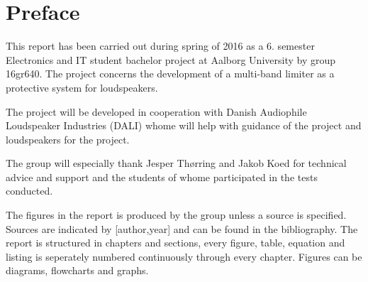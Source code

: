 \chapter*{Preface}\label{ch:forord}%
This report has been carried out during spring of 2016 as a 6. semester Electronics and IT student bachelor project at Aalborg University by group 16gr640. The project concerns the development of a multi-band limiter as a protective system for loudspeakers. 
 
The project will be developed in cooperation with Danish Audiophile Loudspeaker Industries (DALI) whome will help with guidance of the project and loudspeakers for the project. 

The group will especially thank Jesper Thørring and Jakob Koed for technical advice and support and the students of whome participated in the tests conducted.

The figures in the report is produced by the group unless a source is specified. Sources are indicated by [author,year] and can be found in the bibliography. The report is structured in chapters and sections, every figure, table, equation and listing is seperately numbered continuously through every chapter. Figures can be diagrams, flowcharts and graphs.
\\\\

